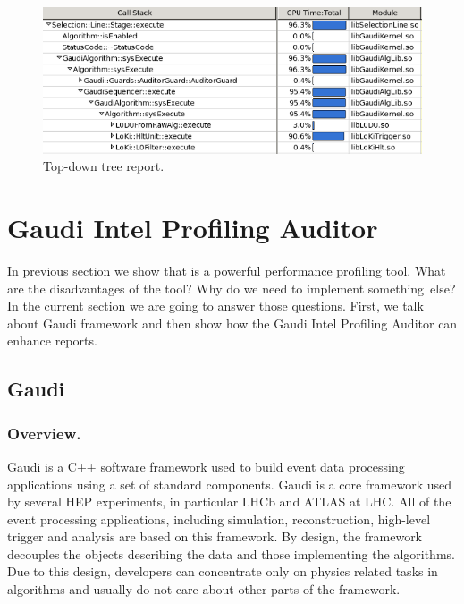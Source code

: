 \documentclass[a4paper]{jpconf}
\begin{document}
\begin{figure}[H]
\begin{minipage}{\textwidth}
\includegraphics[width=\textwidth]{figs/fig06.png}
\caption{\label{fig06}Top-down tree report.}
\end{minipage}
\end{figure}

\section{Gaudi Intel Profiling Auditor}

In previous section we show that \iamp is a powerful performance profiling tool. What are the disadvantages of the tool? 
Why do we need to implement something~else? In the current section we are going to answer those questions. 
First, we talk about Gaudi framework and then show how the Gaudi Intel Profiling Auditor can enhance \amp reports.

\subsection{Gaudi}

\subsubsection{Overview.}

Gaudi is a C++ software framework used to build event data processing applications using a set of standard components.  
Gaudi is a core framework used by several HEP experiments, in particular LHCb and ATLAS at LHC. 
All of the event processing applications, including simulation, reconstruction, high-level trigger and analysis 
are based on this framework. By design, the framework decouples the objects  describing the data and those 
implementing the algorithms. Due to this design,  developers can concentrate only on  physics related tasks 
in algorithms and usually do not care about other parts of the framework. 
\end{document}
